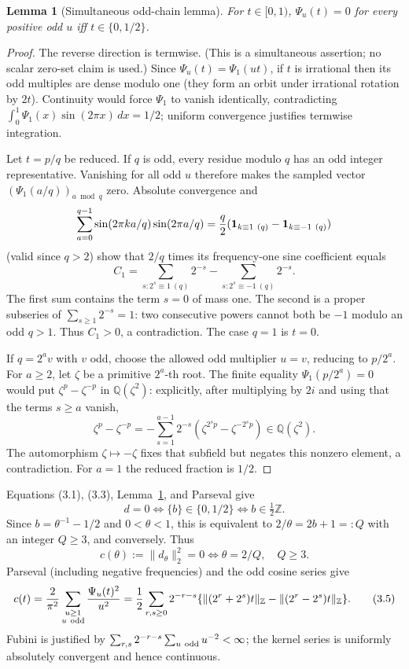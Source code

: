 \documentclass[11pt]{article}
\numberwithin{equation}{section}
\newtheorem{lemma}[theorem]{Lemma}
\newcommand{\1}{\mathbf 1}\newcommand{\F}{\mathcal F}\newcommand{\D}{\mathcal D}
\begin{document}
\begin{lemma}[Simultaneous odd-chain lemma]\label{lem:simultaneous-odd}
For $t\in[0,1)$, $\Psi_u(t)=0$ for every positive odd $u$ iff
$t\in\{0,1/2\}$.
\end{lemma}
\begin{proof}
The reverse direction is termwise.  (This is a simultaneous assertion; no scalar zero-set claim is used.)  Since $\Psi_u(t)=\Psi_1(ut)$, if $t$ is
irrational then its odd multiples are dense modulo one (they form an orbit
under irrational rotation by $2t$).  Continuity would force $\Psi_1$ to
vanish identically, contradicting
$\int_0^1\Psi_1(x)\sin(2\pi x)\,dx=1/2$; uniform convergence justifies
termwise integration.

Let $t=p/q$ be reduced.  If $q$ is odd, every residue modulo $q$ has an odd
integer representative.  Vanishing for all odd $u$ therefore makes the
sampled vector $(\Psi_1(a/q))_{a\bmod q}$ zero.  Absolute convergence and
\[
 \sum_{a=0}^{q-1}\sin(2\pi ka/q)\sin(2\pi a/q)
 ={q\over2}({\bf1}_{k\equiv1\ (q)}-{\bf1}_{k\equiv-1\ (q)})
\]
(valid since $q>2$) show that $2/q$ times its frequency-one sine
coefficient equals
\[
 C_1=\sum_{s:2^s\equiv1\ (q)}2^{-s}
     -\sum_{s:2^s\equiv-1\ (q)}2^{-s}.
\]
The first sum contains the term $s=0$ of mass one.  The second is a proper
subseries of $\sum_{s\geq1}2^{-s}=1$: two consecutive powers cannot both be
$-1$ modulo an odd $q>1$.  Thus $C_1>0$, a contradiction.  The case $q=1$
is $t=0$.

If $q=2^av$ with $v$ odd, choose the allowed odd multiplier $u=v$, reducing
to $p/2^a$.  For $a\geq2$, let $\zeta$ be a primitive $2^a$-th root.  The
finite equality $\Psi_1(p/2^a)=0$ would put
$\zeta^p-\zeta^{-p}$ in $\mathbb Q(\zeta^2)$: explicitly, after multiplying
by $2i$ and using that the terms $s\geq a$ vanish,
\[
 \zeta^p-\zeta^{-p}
 =-\sum_{s=1}^{a-1}2^{-s}
       (\zeta^{2^sp}-\zeta^{-2^sp})\in\mathbb Q(\zeta^2).
\]
The automorphism $\zeta\mapsto-\zeta$ fixes that
subfield but negates this nonzero element, a contradiction.  For $a=1$ the
reduced fraction is $1/2$.
\end{proof}

Equations (3.1), (3.3), Lemma~\ref{lem:simultaneous-odd}, and Parseval give
\[
 d=0\iff\{b\}\in\{0,1/2\}\iff b\in\tfrac12\mathbb Z.
\]
Since $b=\theta^{-1}-1/2$ and $0<\theta<1$, this is equivalent to
$2/\theta=2b+1=:Q$ with an integer $Q\ge3$, and conversely.  Thus
\[
 c(\theta):=\|d_\theta\|_2^2=0\iff\theta=2/Q,\quad Q\ge3.       \tag{3.4}
\]
Parseval (including negative frequencies) and the odd cosine series give
\[
 c(t)={2\over\pi^2}\sum_{\substack{u\ge1\\u\ {\rm odd}}}{\Psi_u(t)^2\over u^2}
 ={1\over2}\sum_{r,s\ge0}2^{-r-s}
 \{\|(2^r+2^s)t\|_{\mathbb Z}-\|(2^r-2^s)t\|_{\mathbb Z}\}.    \tag{3.5}
\]
Fubini is justified by
$\sum_{r,s}2^{-r-s}\sum_{u\ {\rm odd}}u^{-2}<\infty$; the kernel series is
uniformly absolutely convergent and hence continuous.
\end{document}

